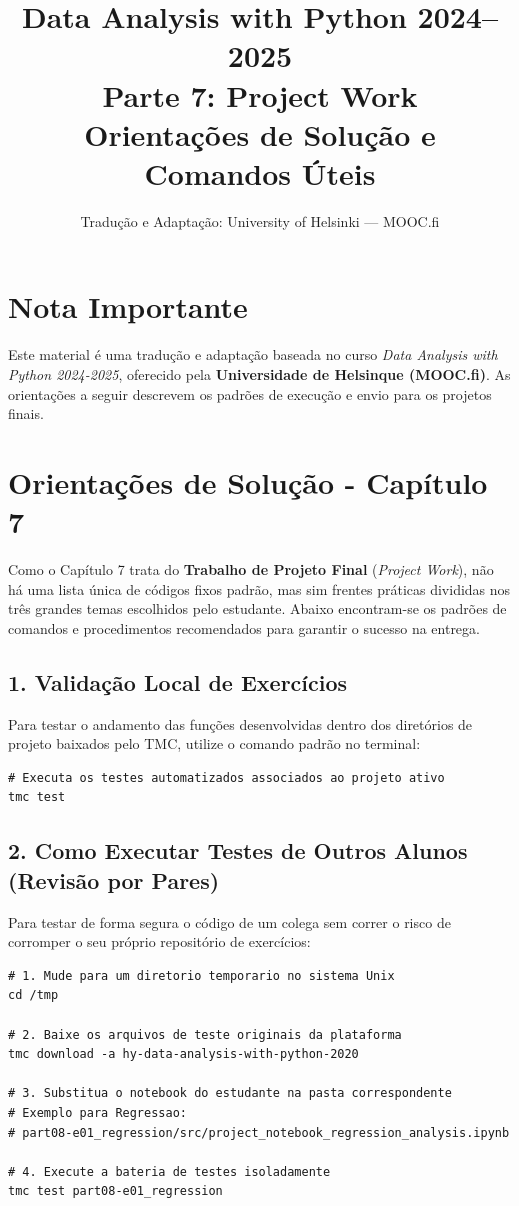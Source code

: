 \documentclass[11pt,a4paper]{article}
\title{\textbf{Data Analysis with Python 2024--2025}\\Parte 7: Project Work\\\large Orientações de Solução e Comandos Úteis}
\author{Tradução e Adaptação: University of Helsinki --- MOOC.fi}
\date{}
\begin{document}
\maketitle

\section*{Nota Importante}
Este material é uma tradução e adaptação baseada no curso \textit{Data Analysis with Python 2024-2025}, oferecido pela \textbf{Universidade de Helsinque (MOOC.fi)}. As orientações a seguir descrevem os padrões de execução e envio para os projetos finais.

\tableofcontents
\newpage

\section{Orientações de Solução - Capítulo 7}

Como o Capítulo 7 trata do \textbf{Trabalho de Projeto Final} (\emph{Project Work}), não há uma lista única de códigos fixos padrão, mas sim frentes práticas divididas nos três grandes temas escolhidos pelo estudante. Abaixo encontram-se os padrões de comandos e procedimentos recomendados para garantir o sucesso na entrega.

\subsection*{1. Validação Local de Exercícios}

Para testar o andamento das funções desenvolvidas dentro dos diretórios de projeto baixados pelo TMC, utilize o comando padrão no terminal:

\begin{solucao}
\begin{lstlisting}
# Executa os testes automatizados associados ao projeto ativo
tmc test
\end{lstlisting}
\end{solucao}

\subsection*{2. Como Executar Testes de Outros Alunos (Revisão por Pares)}

Para testar de forma segura o código de um colega sem correr o risco de corromper o seu próprio repositório de exercícios:

\begin{solucao}
\begin{lstlisting}
# 1. Mude para um diretorio temporario no sistema Unix
cd /tmp

# 2. Baixe os arquivos de teste originais da plataforma
tmc download -a hy-data-analysis-with-python-2020

# 3. Substitua o notebook do estudante na pasta correspondente
# Exemplo para Regressao:
# part08-e01_regression/src/project_notebook_regression_analysis.ipynb

# 4. Execute a bateria de testes isoladamente
tmc test part08-e01_regression
\end{lstlisting}
\end{solucao}
\end{document}
